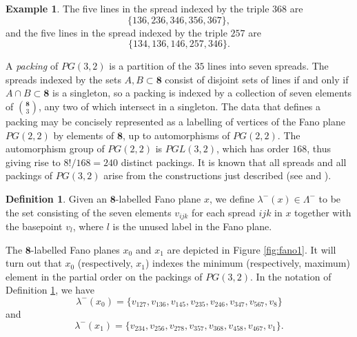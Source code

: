 \documentclass{amsart}
\theoremstyle{plain}
\theoremstyle{definition}
\newtheorem{defn}[theorem]{Definition}
\newtheorem{exa}[theorem]{Example}
\theoremstyle{remark}
\numberwithin{equation}{section}
\newcommand{\eight}{{\mathbf 8}}
\newcommand{\slm}{\lambda^-}
\newcommand{\lamm}{\Lambda^-}
\begin{document}
\begin{exa}\label{exa:spreads}
The five lines in the spread indexed by the triple $368$ are $$
\{136, 236, 346, 356, 367\}
,$$ and the five lines in the spread indexed by the triple $257$ are $$
\{134, 136, 146, 257, 346\}
.$$
\end{exa}

A {\it packing} of $PG(3, 2)$ is a partition of the $35$ lines into seven spreads. The spreads indexed by the sets 
$A, B \subset \eight$ consist of disjoint sets of lines if and only if $A \cap B \subset \eight$ is a singleton, so a 
packing is indexed by a collection of seven elements of $\binom{\eight}{3}$, any two of which intersect in a singleton. 
The data that defines a packing may be concisely represented as a labelling of vertices of the Fano plane $PG(2, 2)$ 
by elements of $\eight$, up to automorphisms of $PG(2, 2)$. The automorphism group of $PG(2, 2)$ is $PGL(3, 2)$, which 
has order $168$, thus giving rise to $8!/168=240$ distinct packings. It is known that all spreads and all packings 
of $PG(3, 2)$ arise from the constructions just described (see \cite[4.2]{hall80} and \cite{magaud22}).

\begin{defn}\label{def:slm}
Given an $\eight$-labelled Fano plane $x$, we define $\slm(x) \in \lamm$ to be the set consisting of
the seven elements $v_{ijk}$ for each spread $ijk$ in $x$ together with the basepoint $v_l$, where
$l$ is the unused label in the Fano plane. 
\end{defn}

The $\eight$-labelled Fano planes $x_0$ and $x_1$ are depicted in Figure \ref{fig:fano1}. It will turn out that 
$x_0$ (respectively, $x_1$) indexes the minimum (respectively, maximum) element in the partial order on the packings 
of $PG(3, 2)$. In the notation of Definition \ref{def:slm}, we have $$
\slm(x_0) = \{ v_{127},
v_{136},
v_{145},
v_{235},
v_{246},
v_{347},
v_{567},
v_{8}\}
$$ and $$
\slm(x_1) = \{v_{234},
v_{256},
v_{278},
v_{357},
v_{368},
v_{458},
v_{467},
v_{1}\}
.$$
\end{document}
